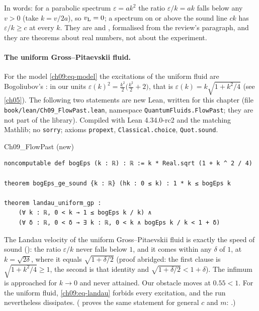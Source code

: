 In words: for a parabolic spectrum $\varepsilon=ak^2$ the ratio $\varepsilon/k=ak$ falls below any $v>0$ (take $k=v/2a$), so $v_{\rm L}=0$; a spectrum on or above the sound line $ck$ has $\varepsilon/k\ge c$ at every $k$. They are  and , formalised from the review's paragraph, and they are theorems about real numbers, not about the experiment.

\paragraph{The uniform Gross--Pitaevskii fluid.} For the model \eqref{ch09:eq-model} the excitations of the uniform fluid are Bogoliubov's \cite{Bogoliubov1947}: in our units $\varepsilon(k)^2=\tfrac{k^2}2\bigl(\tfrac{k^2}2+2\bigr)$, that is $\varepsilon(k)=k\sqrt{1+k^2/4}$ (see \cref{ch05}). The following two statements are new Lean, written for this chapter (file \texttt{book/lean/Ch09\_FlowPast.lean}, namespace \texttt{QuantumFluids.FlowPast}; they are not part of the library). Compiled with Lean 4.34.0-rc2 and the matching Mathlib; no \texttt{sorry}; axioms \texttt{propext}, \texttt{Classical.choice}, \texttt{Quot.sound}.

\begin{leanbox}[title={Lean 4 \enspace FlowPast (new for this book)}]{Ch09\_FlowPast (new)}
\begin{lstlisting}[style=lean]
noncomputable def bogEps (k : ℝ) : ℝ := k * Real.sqrt (1 + k ^ 2 / 4)

theorem bogEps_ge_sound {k : ℝ} (hk : 0 ≤ k) : 1 * k ≤ bogEps k

theorem landau_uniform_gp :
    (∀ k : ℝ, 0 < k → 1 ≤ bogEps k / k) ∧
    (∀ δ : ℝ, 0 < δ → ∃ k : ℝ, 0 < k ∧ bogEps k / k < 1 + δ)
\end{lstlisting}
\end{leanbox}

The Landau velocity of the uniform Gross--Pitaevskii fluid is exactly the speed of sound (): the ratio $\varepsilon/k$ never falls below $1$, and it comes within any $\delta$ of $1$, at $k=\sqrt{2\delta}$, where it equals $\sqrt{1+\delta/2}$ (proof abridged: the first clause is $\sqrt{1+k^2/4}\ge1$, the second is that identity and $\sqrt{1+\delta/2}<1+\delta$). The infimum is approached for $k\to0$ and never attained. Our obstacle moves at $0.55<1$. For the uniform fluid, \eqref{ch09:eq-landau} forbids every excitation, and the run nevertheless dissipates. ( proves the same statement for general $c$ and $m$: .)

